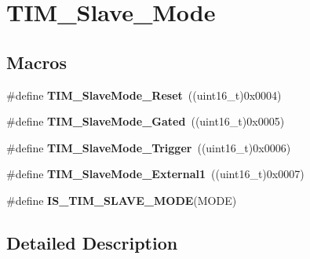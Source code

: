 \hypertarget{group___t_i_m___slave___mode}{\section{T\-I\-M\-\_\-\-Slave\-\_\-\-Mode}
\label{group___t_i_m___slave___mode}
}
\subsection*{Macros}
\begin{DoxyCompactItemize}
\item 
\hypertarget{group___t_i_m___slave___mode_gaac1cec731f1a5e680a038c4f472f74af}{\#define {\bfseries T\-I\-M\-\_\-\-Slave\-Mode\-\_\-\-Reset}~((uint16\-\_\-t)0x0004)}\label{group___t_i_m___slave___mode_gaac1cec731f1a5e680a038c4f472f74af}

\item 
\hypertarget{group___t_i_m___slave___mode_ga1f36c870b926f70b32f274bbc0bc39a5}{\#define {\bfseries T\-I\-M\-\_\-\-Slave\-Mode\-\_\-\-Gated}~((uint16\-\_\-t)0x0005)}\label{group___t_i_m___slave___mode_ga1f36c870b926f70b32f274bbc0bc39a5}

\item 
\hypertarget{group___t_i_m___slave___mode_ga9e7726c04ee1bafec97226f08adf5677}{\#define {\bfseries T\-I\-M\-\_\-\-Slave\-Mode\-\_\-\-Trigger}~((uint16\-\_\-t)0x0006)}\label{group___t_i_m___slave___mode_ga9e7726c04ee1bafec97226f08adf5677}

\item 
\hypertarget{group___t_i_m___slave___mode_ga34427a693157ab177fead9871185bd35}{\#define {\bfseries T\-I\-M\-\_\-\-Slave\-Mode\-\_\-\-External1}~((uint16\-\_\-t)0x0007)}\label{group___t_i_m___slave___mode_ga34427a693157ab177fead9871185bd35}

\item 
\#define {\bfseries I\-S\-\_\-\-T\-I\-M\-\_\-\-S\-L\-A\-V\-E\-\_\-\-M\-O\-D\-E}(M\-O\-D\-E)
\end{DoxyCompactItemize}


\subsection{Detailed Description}


